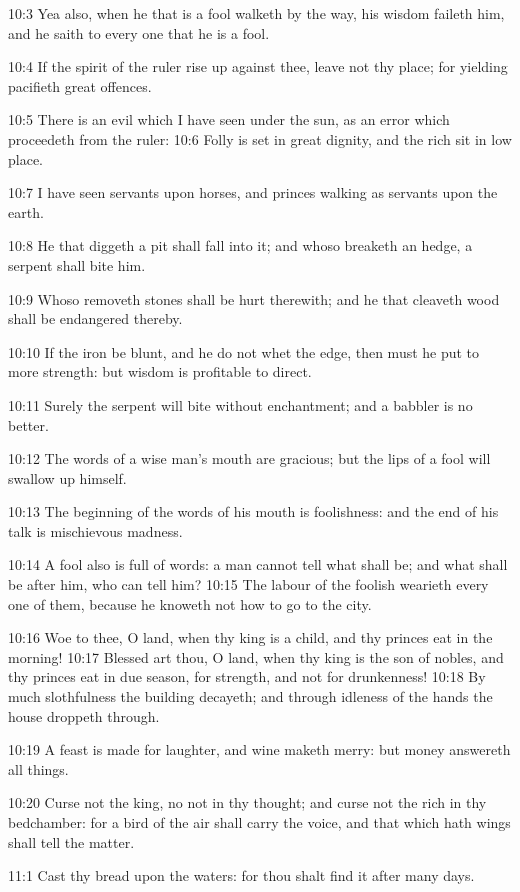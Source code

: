 10:3 Yea also, when he that is a fool walketh by the way, his wisdom
faileth him, and he saith to every one that he is a fool.

10:4 If the spirit of the ruler rise up against thee, leave not thy
place; for yielding pacifieth great offences.

10:5 There is an evil which I have seen under the sun, as an error
which proceedeth from the ruler: 10:6 Folly is set in great dignity,
and the rich sit in low place.

10:7 I have seen servants upon horses, and princes walking as servants
upon the earth.

10:8 He that diggeth a pit shall fall into it; and whoso breaketh an
hedge, a serpent shall bite him.

10:9 Whoso removeth stones shall be hurt therewith; and he that
cleaveth wood shall be endangered thereby.

10:10 If the iron be blunt, and he do not whet the edge, then must he
put to more strength: but wisdom is profitable to direct.

10:11 Surely the serpent will bite without enchantment; and a babbler
is no better.

10:12 The words of a wise man's mouth are gracious; but the lips of a
fool will swallow up himself.

10:13 The beginning of the words of his mouth is foolishness: and the
end of his talk is mischievous madness.

10:14 A fool also is full of words: a man cannot tell what shall be;
and what shall be after him, who can tell him?  10:15 The labour of
the foolish wearieth every one of them, because he knoweth not how to
go to the city.

10:16 Woe to thee, O land, when thy king is a child, and thy princes
eat in the morning!  10:17 Blessed art thou, O land, when thy king is
the son of nobles, and thy princes eat in due season, for strength,
and not for drunkenness!  10:18 By much slothfulness the building
decayeth; and through idleness of the hands the house droppeth
through.

10:19 A feast is made for laughter, and wine maketh merry: but money
answereth all things.

10:20 Curse not the king, no not in thy thought; and curse not the
rich in thy bedchamber: for a bird of the air shall carry the voice,
and that which hath wings shall tell the matter.

11:1 Cast thy bread upon the waters: for thou shalt find it after many
days.

